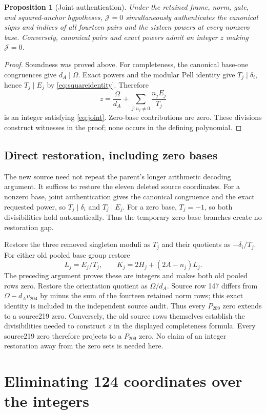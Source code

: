 \documentclass[11pt]{article}
\newtheorem{proposition}[theorem]{Proposition}
\theoremstyle{definition}\newtheorem{definition}[theorem]{Definition}
\theoremstyle{remark}\newtheorem{remark}[theorem]{Remark}
\begin{document}
\begin{proposition}[Joint authentication]
Under the retained frame, norm, gate, and squared-anchor hypotheses,
$\mathcal J=0$ simultaneously authenticates the canonical signs and
indices of all fourteen pairs and the sixteen powers at every nonzero
base. Conversely, canonical pairs and exact powers admit an integer
$z$ making $\mathcal J=0$.
\end{proposition}
\begin{proof}
Soundness was proved above. For completeness, the canonical base-one
congruences give $d_A\mid\Omega$. Exact powers and the modular Pell
identity give $T_j\mid\delta_i$, hence $T_j\mid E_j$ by
\eqref{eq:squareidentity}. Therefore
\[
 z=\frac{\Omega}{d_A}+\sum_{j:n_j\ne0}\frac{n_jE_j}{T_j}
\]
is an integer satisfying \eqref{eq:joint}. Zero-base contributions are
zero. These divisions construct witnesses in the proof; none occurs
in the defining polynomial.
\end{proof}

\subsection{Direct restoration, including zero bases}
The new source need not repeat the parent's longer arithmetic decoding
argument. It suffices to restore the eleven deleted source coordinates.
For a nonzero base, joint authentication gives the canonical congruence
and the exact requested power, so $T_j\mid\delta_i$ and $T_j\mid E_j$.
For a zero base, $T_j=-1$, so both divisibilities hold automatically.
Thus the temporary zero-base branches create no restoration gap.

Restore the three removed singleton moduli as $T_j$ and their
quotients as $-\delta_i/T_j$. For either old pooled base group restore
\[
 L_j=E_j/T_j,\qquad K_j=2H_j+(2A-n_j)L_j.
\]
The preceding argument proves these are integers and makes both old
pooled rows zero. Restore the orientation quotient as
$\Omega/d_A$. Source row 147 differs from
$\Omega-d_Av_{204}$ by minus the sum of the fourteen retained
norm rows; this exact identity is included in the independent source
audit. Thus every $P_{209}$ zero extends to a source219 zero. Conversely,
the old source rows themselves establish the divisibilities needed to
construct $z$ in the displayed completeness formula. Every source219
zero therefore projects to a $P_{209}$ zero. No claim of an
integer restoration away from the zero sets is needed here.

\section{Eliminating 124 coordinates over the integers}
\label{sec:elimination}
\end{document}
